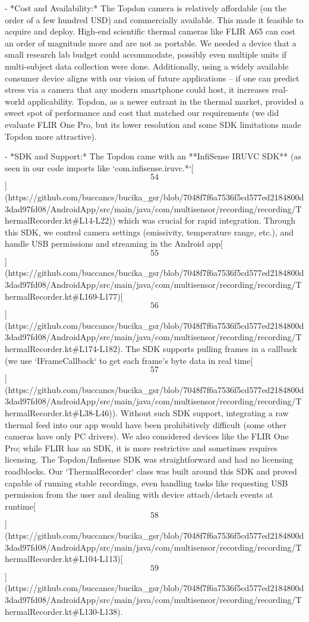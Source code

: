 \documentclass[12pt,a4paper]{article}
\begin{document}
- *Cost and Availability:* The Topdon camera is relatively affordable
  (on the order of a few hundred USD) and commercially available. This
  made it feasible to acquire and deploy. High-end scientific thermal
  cameras like FLIR A65 can cost an order of magnitude more and are not
  as portable. We needed a device that a small research lab budget could
  accommodate, possibly even multiple units if multi-subject data
  collection were done. Additionally, using a widely available consumer
  device aligns with our vision of future applications -- if one can
  predict stress via a camera that any modern smartphone could host, it
  increases real-world applicability. Topdon, as a newer entrant in the
  thermal market, provided a sweet spot of performance and cost that
  matched our requirements (we did evaluate FLIR One Pro, but its lower
  resolution and some SDK limitations made Topdon more attractive).

- *SDK and Support:* The Topdon came with an **InfiSense IRUVC SDK** (as
  seen in our code imports like
  `com.infisense.iruvc.*`[\[54\]](https://github.com/buccancs/bucika_gsr/blob/7048f7f6a7536f5cd577ed2184800d3dad97fd08/AndroidApp/src/main/java/com/multisensor/recording/recording/ThermalRecorder.kt#L14-L22))
  which was crucial for rapid integration. Through this SDK, we control
  camera settings (emissivity, temperature range, etc.), and handle USB
  permissions and streaming in the Android
  app[\[55\]](https://github.com/buccancs/bucika_gsr/blob/7048f7f6a7536f5cd577ed2184800d3dad97fd08/AndroidApp/src/main/java/com/multisensor/recording/recording/ThermalRecorder.kt#L169-L177)[\[56\]](https://github.com/buccancs/bucika_gsr/blob/7048f7f6a7536f5cd577ed2184800d3dad97fd08/AndroidApp/src/main/java/com/multisensor/recording/recording/ThermalRecorder.kt#L174-L182).
  The SDK supports pulling frames in a callback (we use `IFrameCallback`
  to get each frame's byte data in real
  time[\[57\]](https://github.com/buccancs/bucika_gsr/blob/7048f7f6a7536f5cd577ed2184800d3dad97fd08/AndroidApp/src/main/java/com/multisensor/recording/recording/ThermalRecorder.kt#L38-L46)).
  Without such SDK support, integrating a raw thermal feed into our app
  would have been prohibitively difficult (some other cameras have only
  PC drivers). We also considered devices like the FLIR One Pro; while
  FLIR has an SDK, it is more restrictive and sometimes requires
  licensing. The Topdon/Infisense SDK was straightforward and had no
  licensing roadblocks. Our `ThermalRecorder` class was built around
  this SDK and proved capable of running stable recordings, even
  handling tasks like requesting USB permission from the user and
  dealing with device attach/detach events at
  runtime[\[58\]](https://github.com/buccancs/bucika_gsr/blob/7048f7f6a7536f5cd577ed2184800d3dad97fd08/AndroidApp/src/main/java/com/multisensor/recording/recording/ThermalRecorder.kt#L104-L113)[\[59\]](https://github.com/buccancs/bucika_gsr/blob/7048f7f6a7536f5cd577ed2184800d3dad97fd08/AndroidApp/src/main/java/com/multisensor/recording/recording/ThermalRecorder.kt#L130-L138).
\end{document}
